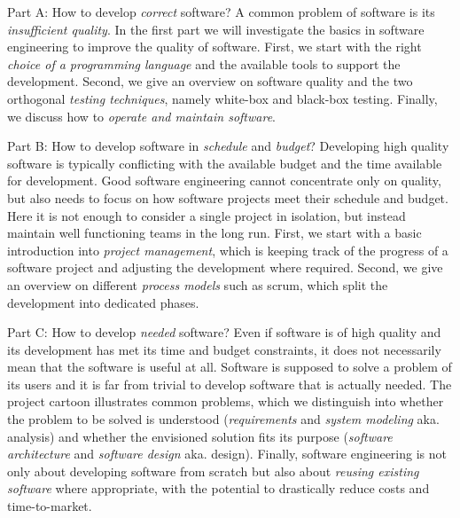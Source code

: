 \begin{frame}{\myframetitle{}}
	\small
	\begin{fancycolumns}[columns=3,t,widths={26,34,38},animation=none]
		\begin{definition}{Part A: How to develop \emph{correct} software?}
			A common problem of software is its \emph{insufficient quality}. In the first part we will investigate the basics in software engineering to improve the quality of software. First, we start with the right \emph{choice of a programming language} and the available tools to support the development. Second, we give an overview on software quality and the two orthogonal \emph{testing techniques}, namely white-box and black-box testing. %
			Finally, we discuss how to \emph{operate and maintain software}.
		\end{definition}
	\nextcolumn
		\begin{definition}{Part B: How to develop software in \emph{schedule} and \emph{budget}?}
			Developing high quality software is typically conflicting with the available budget and the time available for development. Good software engineering cannot concentrate only on quality, but also needs to focus on how software projects meet their schedule and budget. Here it is not enough to consider a single project in isolation, but instead maintain well functioning teams in the long run. First, we start with a basic introduction into \emph{project management}, which is keeping track of the progress of a software project and adjusting the development where required. Second, we give an overview on different \emph{process models} such as scrum, which split the development into dedicated phases.
		\end{definition}
	\nextcolumn
		\begin{definition}{Part C: How to develop \emph{needed} software?}
			Even if software is of high quality and its development has met its time and budget constraints, it does not necessarily mean that the software is useful at all. Software is supposed to solve a problem of its users and it is far from trivial to develop software that is actually needed. The project cartoon illustrates common problems, which we distinguish into whether the problem to be solved is understood (\emph{requirements} and \emph{system modeling} aka. analysis) and whether the envisioned solution fits its purpose (\emph{software architecture} and \emph{software design} aka. design). Finally, software engineering is not only about developing software from scratch but also about \emph{reusing existing software} where appropriate, with the potential to drastically reduce costs and time-to-market.
		\end{definition}
	\end{fancycolumns}
\end{frame}

